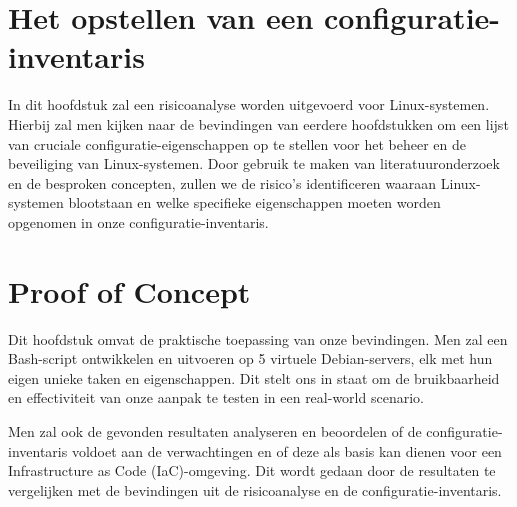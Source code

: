 \section{Het opstellen van een configuratie-inventaris}
\label{sec:risicoanalyse}
In dit hoofdstuk zal een risicoanalyse worden uitgevoerd voor Linux-systemen.
Hierbij zal men kijken naar de bevindingen van eerdere hoofdstukken om een lijst van cruciale configuratie-eigenschappen op te stellen voor het beheer en de beveiliging van Linux-systemen.
Door gebruik te maken van literatuuronderzoek en de besproken concepten, zullen we de risico's identificeren waaraan Linux-systemen blootstaan en welke specifieke eigenschappen moeten worden opgenomen in onze configuratie-inventaris.

\section{Proof of Concept}
\label{sec:proof-of-concept}
Dit hoofdstuk omvat de praktische toepassing van onze bevindingen.
Men zal een Bash-script ontwikkelen en uitvoeren op 5 virtuele Debian-servers, elk met hun eigen unieke taken en eigenschappen.
Dit stelt ons in staat om de bruikbaarheid en effectiviteit van onze aanpak te testen in een real-world scenario.

Men zal ook de gevonden resultaten analyseren en beoordelen of de configuratie-inventaris voldoet aan de verwachtingen en of deze als basis kan dienen voor een Infrastructure as Code (IaC)-omgeving.
Dit wordt gedaan door de resultaten te vergelijken met de bevindingen uit de risicoanalyse en de configuratie-inventaris.
